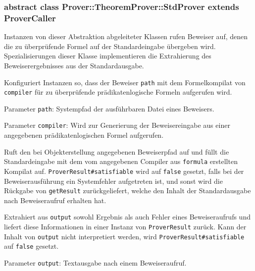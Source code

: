 \subsubsection{abstract class Prover::TheoremProver::StdProver extends ProverCaller}%

Instanzen von dieser Abstraktion abgeleiteter Klassen rufen Beweiser
auf, denen die zu überprüfende Formel auf der Standardeingabe
übergeben wird. Spezialisierungen dieser Klasse implementieren die
Extrahierung des Beweiserergebnisses aus der Standardausgabe.%

\begin{description}%

    Konfiguriert Instanzen so, dass der Beweiser \texttt{path} mit dem
    Formelkompilat von \texttt{compiler} für zu überprüfende
    prädikatenlogische Formeln aufgerufen wird.%

    Parameter \texttt{path}: Systempfad der ausführbaren Datei eines
    Beweisers.%

    Parameter \texttt{compiler}: Wird zur Generierung der
    Beweisereingabe aus einer angegebenen prädikatenlogischen Formel
    aufgerufen.%


    Ruft den bei Objekterstellung angegebenen Beweiserpfad auf und
    füllt die Standardeingabe mit dem vom angegebenen Compiler aus
    \texttt{formula} erstellten Kompilat auf.
    \texttt{ProverResult\#satisfiable} wird auf \texttt{false}
    gesetzt, falls bei der Beweiserausführung ein Systemfehler
    aufgetreten ist, und sonst wird die Rückgabe von
    \texttt{getResult} zurückgeliefert, welche den Inhalt der
    Standardausgabe nach Beweiseraufruf erhalten hat.%


    Extrahiert aus \texttt{output} sowohl Ergebnis als auch Fehler
    eines Beweiseraufrufs und liefert diese Informationen in einer
    Instanz von \texttt{ProverResult} zurück. Kann der Inhalt von
    \texttt{output} nicht interpretiert werden, wird
    \texttt{ProverResult\#satisfiable} auf \texttt{false} gesetzt.%

    Parameter \texttt{output}: Textausgabe nach einem Beweiseraufruf.%

\end{description}%

